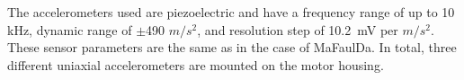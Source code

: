 The accelerometers used are piezoelectric and have a frequency range of up to 10 kHz, dynamic range of $\pm$490 $m/s^2$, and resolution step of 10.2~mV per $m/s^2$. These sensor parameters are the same as in the case of MaFaulDa. In total, three different uniaxial accelerometers are mounted on the motor housing.
